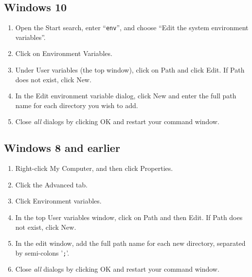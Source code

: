 \documentclass{article}
\begin{document}
\subsection*{Windows 10}

\begin{enumerate}

\item Open the {\sf Start} search, enter ``{\tt env}'', and choose
{\sf ``Edit the system environment variables''}.

\item Click on {\sf Environment Variables}.

\item Under {\sf User variables} (the top window), click on {\sf Path}
and click {\sf Edit}. If {\sf Path} does not exist, click {\sf New}.

\item In the {\sf Edit environment variable} dialog, click {\sf New}
and enter the full path name for each directory you wish to add.

\item Close {\it all} dialogs by clicking {\sf OK} and restart 
your command window.

\end{enumerate}

\subsection*{Windows 8 and earlier}

\begin{enumerate}

\item Right-click {\sf My Computer}, and then click {\sf Properties}.

\item Click the {\sf Advanced} tab.

\item Click {\sf Environment variables}.

\item In the top {\sf User variables} window, click on {\sf Path} and 
then {\sf Edit}. If {\sf Path} does not exist, click {\sf New}.

\item In the edit window, add the full path name for each new directory,
separated by semi-colons '{\tt ;}'.

\item Close {\it all} dialogs by clicking {\sf OK} and restart 
your command window.

\end{enumerate}
\end{document}
